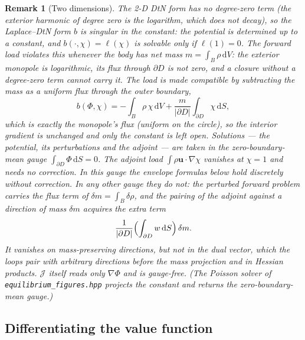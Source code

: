 \documentclass[11pt]{article}
\newtheorem{remark}{Remark}
\newcommand{\Jf}{\mathscr{J}}  %
\newcommand{\bu}{\mathbf{u}}
\newcommand{\dS}{\,\mathrm{d}S}
\newcommand{\dV}{\,\mathrm{d}V}
\begin{document}
\begin{remark}[Two dimensions]\label{rem:2d}
The 2-D DtN form has no degree-zero term (the exterior harmonic of
degree zero is the logarithm, which does not decay), so the
Laplace--DtN form $b$ is singular in the constant: the potential is
determined up to a constant, and $b(\cdot,\chi) = \ell(\chi)$ is solvable
only if $\ell(1) = 0$. The forward load violates this whenever the body
has net mass $m = \int_B\rho\dV$: the exterior monopole is logarithmic,
its flux through $\partial D$ is not zero, and a closure without a
degree-zero term cannot carry it. The load is made compatible by
subtracting the mass as a uniform flux through the outer boundary,
\begin{equation}
  b(\Phi,\chi) = -\int_B\rho\,\chi\dV
  + \frac{m}{|\partial D|}\int_{\partial D}\chi\dS ,
\end{equation}
which is exactly the monopole's flux (uniform on the circle), so the
interior gradient is unchanged and only the constant is left open.
Solutions --- the potential, its perturbations and the adjoint --- are
taken in the zero-boundary-mean gauge $\int_{\partial D}\Phi\dS = 0$.
The adjoint load $\int\rho\bu\cdot\nabla\chi$ vanishes at $\chi = 1$ and
needs no correction. In this gauge the envelope formulas below hold
discretely without correction. In any other gauge they do not: the
perturbed forward problem carries the flux term of $\delta m =
\int_B\delta\rho$, and the pairing of the adjoint against a direction of
mass $\delta m$ acquires the extra term
\begin{equation}
  \frac{1}{|\partial D|}\Bigl(\int_{\partial D} w\dS\Bigr)\,\delta m .
\end{equation}
It vanishes on mass-preserving directions, but not in the dual vector,
which the loops pair with arbitrary directions before the mass
projection and in Hessian products. $\Jf $ itself reads only $\nabla\Phi$
and is gauge-free. (The Poisson solver of \texttt{equilibrium\_figures.hpp}
projects the constant and returns the zero-boundary-mean gauge.)
\end{remark}

\subsection{Differentiating the value function}
\end{document}
